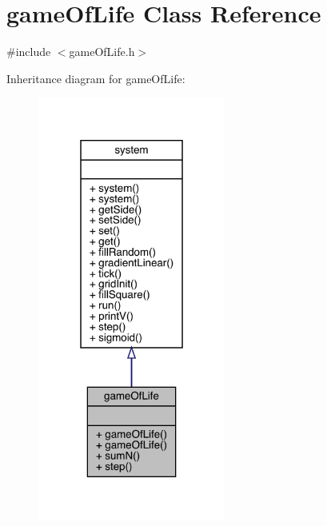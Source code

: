 \hypertarget{classgame_of_life}{}\section{game\+Of\+Life Class Reference}
\label{classgame_of_life}


{\ttfamily \#include $<$game\+Of\+Life.\+h$>$}



Inheritance diagram for game\+Of\+Life\+:
\nopagebreak
\begin{figure}[H]
\begin{center}
\leavevmode
\includegraphics[width=175pt]{classgame_of_life__inherit__graph}
\end{center}
\end{figure}


